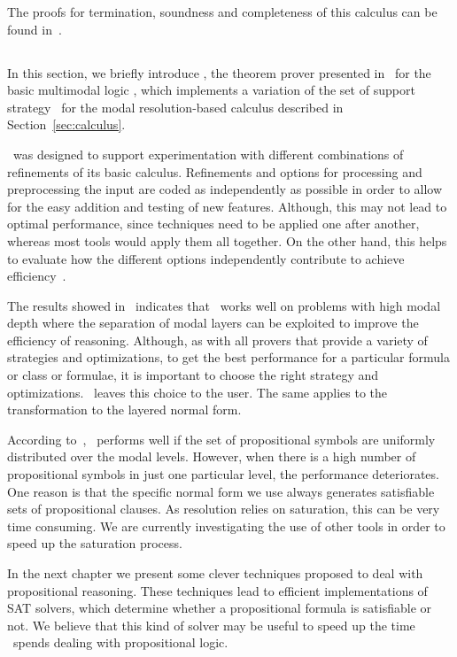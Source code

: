 The proofs for termination, soundness and completeness of this calculus can be
found in~\cite{nalon2015modal}.

\subsection{\ksp}
In this section, we briefly introduce \ksp, the theorem prover presented
in~\cite{Nalon2016} for the basic multimodal logic , which
implements a variation of the set of support strategy~\cite{wos1965efficiency}
for the modal resolution-based calculus described in Section~\ref{sec:calculus}.

\ksp\ was designed to support experimentation with different combinations of
refinements of its basic calculus. Refinements and options for processing and
preprocessing the input are coded as independently as possible in order to allow
for the easy addition and testing of new features. Although, this may not lead
to optimal performance, since techniques need to be applied one after another,
whereas most tools would apply them all together. On the other hand, this helps
to evaluate how the different options independently contribute to achieve
efficiency~\cite{Nalon2016}. 

The results showed in~\cite{Nalon2016} indicates that \ksp\ works well on
problems with high modal depth where the separation of modal layers can be
exploited to improve the efficiency of reasoning. Although, as with all provers
that provide a variety of strategies and optimizations, to get the best
performance for a particular formula or class or formulae, it is important to
choose the right strategy and optimizations. \ksp\ leaves this choice to the
user. The same applies to the transformation to the layered normal form.

According to~\cite{Nalon2016}, \ksp\ performs well if the set of propositional
symbols are uniformly distributed over the modal levels. However, when there is
a high number of propositional symbols in just one particular level, the
performance deteriorates. One reason is that the specific normal form we use
always generates satisfiable sets of propositional clauses. As resolution relies
on saturation, this can be very time consuming. We are currently investigating
the use of other tools in order to speed up the saturation process.

In the next chapter we present some clever techniques proposed to deal with
propositional reasoning. These techniques lead to efficient implementations of
SAT solvers, which determine whether a propositional formula is satisfiable or
not. We believe that this kind of solver may be useful to speed up the time
\ksp\ spends dealing with propositional logic.
